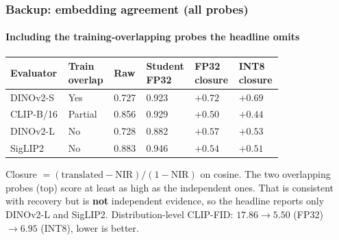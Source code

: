\documentclass[
	aspectratio=169,
	t,
	onlytextwidth,
	10pt,
]{beamer}
\newcommand{\up}[1]{\textcolor{GoodGreen}{#1}}
\newcommand{\dn}[1]{\textcolor{BadRed}{#1}}
\begin{document}
\begin{frame}
	\frametitle{Backup: embedding agreement (all probes)}
	\framesubtitle{Including the training-overlapping probes the headline omits}

	\centering
	\small
	\begin{tabular}{L{0.20\linewidth} C{0.13\linewidth} C{0.10\linewidth} C{0.12\linewidth} C{0.12\linewidth} C{0.12\linewidth}}
		\toprule
		\textbf{Evaluator} & \textbf{Train overlap} & \textbf{Raw} & \textbf{Student FP32} & \textbf{FP32 closure} & \textbf{INT8 closure}\\
		\midrule
		DINOv2-S   & \dn{Yes}     & 0.727 & 0.923 & \up{$+0.72$} & \up{$+0.69$}\\
		CLIP-B/16  & \dn{Partial} & 0.856 & 0.929 & \up{$+0.50$} & \up{$+0.44$}\\
		\midrule
		DINOv2-L   & \up{No}      & 0.728 & 0.882 & \up{$+0.57$} & \up{$+0.53$}\\
		SigLIP2    & \up{No}      & 0.883 & 0.946 & \up{$+0.54$} & \up{$+0.51$}\\
		\bottomrule
	\end{tabular}

	\vspace{0.5\baselineskip}
	{\footnotesize Closure $=(\text{translated}-\text{NIR})/(1-\text{NIR})$ on cosine. The two overlapping probes (top) score at least as high as the independent ones. That is consistent with recovery but is \textbf{not} independent evidence, so the headline reports only DINOv2-L and SigLIP2. Distribution-level CLIP-FID: $17.86 \rightarrow 5.50$ (FP32) $\rightarrow 6.95$ (INT8), lower is better.}
\end{frame}
\end{document}
